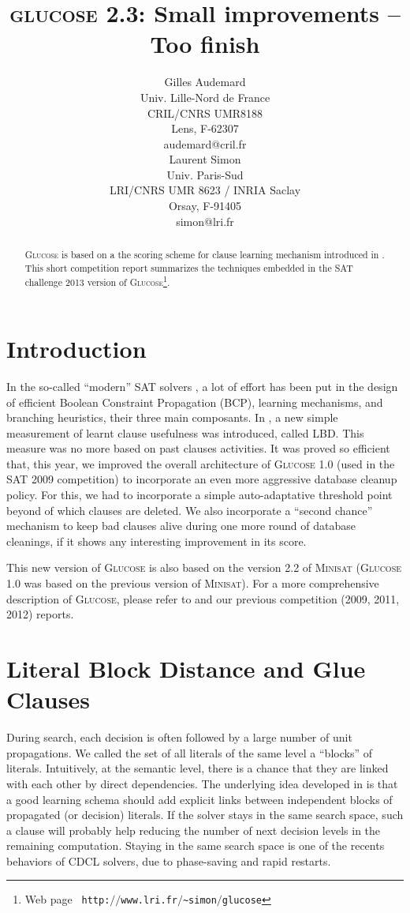 \documentclass[letterpaper]{article}
\title{\textsc{glucose} 2.3:  Small improvements -- Too finish}
\author{Gilles Audemard\\
Univ. Lille-Nord de France\\
CRIL/CNRS UMR8188\\
Lens, F-62307\\
audemard@cril.fr\\
\And
Laurent Simon\\
Univ. Paris-Sud\\
LRI/CNRS UMR 8623 / INRIA Saclay\\
Orsay, F-91405\\simon@lri.fr
}
\newcommand{\minisat}{\textsc{Minisat}\xspace}
\newcommand{\mdcl}{\textsc{Glucose}\xspace}
\begin{document}
\maketitle

\begin{abstract}

  \mdcl is based on a the scoring scheme for clause learning mechanism
 introduced in \cite{AS-ijcai09}. This short competition report
  summarizes the techniques embedded in the SAT challenge 2013  version
  of \mdcl\footnote{Web page {\tt\small
    http:$\slash\slash$www.lri.fr$\slash$\~{}simon$\slash$glucose}}.
\end{abstract}


\section{Introduction}

In the so-called ``modern'' SAT solvers \cite{moskewicz01,minisat}, a
lot of effort has been put in the design of efficient Boolean
Constraint Propagation (BCP), learning mechanisms, and branching
heuristics, their three main composants. In \cite{AS-ijcai09}, a new
simple measurement of learnt clause usefulness was introduced, called
LBD. This measure was no more based on past clauses activities. It was
proved so efficient that, this year, we improved the overall
architecture of \mdcl 1.0 (used in the SAT 2009 competition) to
incorporate an even more aggressive database cleanup policy. For this,
we had to incorporate a simple auto-adaptative threshold point beyond
of which clauses are deleted. We also incorporate a ``second chance''
mechanism to keep bad clauses alive during one more round of database
cleanings, if it shows any interesting improvement in its score.

This new version of \mdcl is also based on the version 2.2 of \minisat
\cite{minisat} (\mdcl 1.0 was based on the previous version of
\minisat). For a more comprehensive description of \mdcl, please refer
to \cite{AS-ijcai09} and our previous competition (2009, 2011, 2012) reports.
\section{Literal Block Distance and Glue Clauses}

During search, each decision is often followed by a large number of
unit propagations. We called the set of all literals of the same level
a ``blocks'' of literals. Intuitively, at the semantic level, there is
a chance that they are linked with each other by direct
dependencies. The underlying idea developed in \cite{AS-ijcai09} is
that a good learning schema should add explicit links between
independent blocks of propagated (or decision) literals. If the solver
stays in the same search space, such a clause will probably help
reducing the number of next decision levels in the remaining
computation. Staying in the same search space is one of the recents
behaviors of CDCL solvers, due to phase-saving \cite{rsat} and rapid
restarts.
\end{document}
